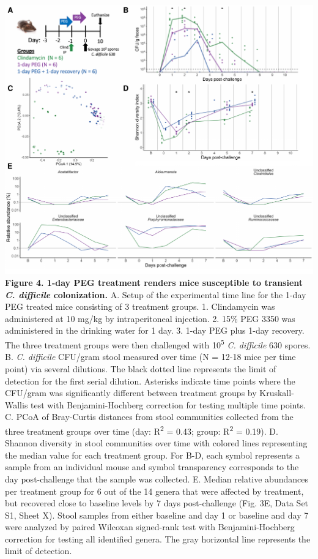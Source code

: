 \documentclass[
  11pt,
]{article}
\begin{document}
\includegraphics{figure_4.pdf} \textbf{Figure 4. 1-day PEG treatment
renders mice susceptible to transient \emph{C. difficile} colonization.}
A. Setup of the experimental time line for the 1-day PEG treated mice
consisting of 3 treatment groups. 1. Clindamycin was administered at 10
mg/kg by intraperitoneal injection. 2. 15\% PEG 3350 was administered in
the drinking water for 1 day. 3. 1-day PEG plus 1-day recovery. The
three treatment groups were then challenged with 10\textsuperscript{5}
\emph{C. difficile} 630 spores. B. \emph{C. difficile} CFU/gram stool
measured over time (N = 12-18 mice per time point) via several
dilutions. The black dotted line represents the limit of detection for
the first serial dilution. Asterisks indicate time points where the
CFU/gram was significantly different between treatment groups by
Kruskall-Wallis test with Benjamini-Hochberg correction for testing
multiple time points. C. PCoA of Bray-Curtis distances from stool
communities collected from the three treatment groups over time (day:
R\textsuperscript{2} = 0.43; group: R\textsuperscript{2} = 0.19). D.
Shannon diversity in stool communities over time with colored lines
representing the median value for each treatment group. For B-D, each
symbol represents a sample from an individual mouse and symbol
transparency corresponds to the day post-challenge that the sample was
collected. E. Median relative abundances per treatment group for 6 out
of the 14 genera that were affected by treatment, but recovered close to
baseline levels by 7 days post-challenge (Fig. 3E, Data Set S1, Sheet
X). Stool samples from either baseline and day 1 or baseline and day 7
were analyzed by paired Wilcoxan signed-rank test with
Benjamini-Hochberg correction for testing all identified genera. The
gray horizontal line represents the limit of detection.
\end{document}
